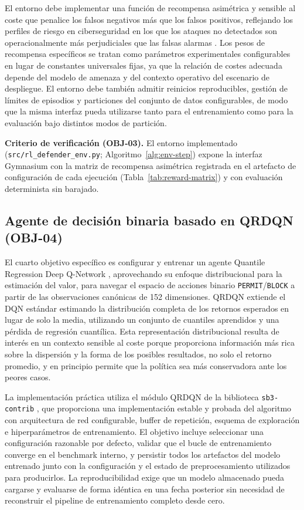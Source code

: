 El entorno debe implementar una función de recompensa asimétrica y sensible al coste que penalice los falsos negativos más que los falsos positivos, reflejando los perfiles de riesgo en ciberseguridad en los que los ataques no detectados son operacionalmente más perjudiciales que las falsas alarmas \parencite{Lee2002CostSensitiveIDS,Cardenas2006IDSFramework}. Los pesos de recompensa específicos se tratan como parámetros experimentales configurables en lugar de constantes universales fijas, ya que la relación de costes adecuada depende del modelo de amenaza y del contexto operativo del escenario de despliegue. El entorno debe también admitir reinicios reproducibles, gestión de límites de episodios y particiones del conjunto de datos configurables, de modo que la misma interfaz pueda utilizarse tanto para el entrenamiento como para la evaluación bajo distintos modos de partición.

\textbf{Criterio de verificación (OBJ-03).} El entorno implementado (\texttt{src/rl\_defender\_env.py}; Algoritmo~\ref{alg:env-step}) expone la interfaz Gymnasium con la matriz de recompensa asimétrica registrada en el artefacto de configuración de cada ejecución (Tabla~\ref{tab:reward-matrix}) y con evaluación determinista sin barajado.

\subsection{Agente de decisión binaria basado en QRDQN (OBJ-04)}
El cuarto objetivo específico es configurar y entrenar un agente Quantile Regression Deep Q-Network \parencite{Dabney2018QRDQN}, aprovechando su enfoque distribucional para la estimación del valor, para navegar el espacio de acciones binario \texttt{PERMIT}/\texttt{BLOCK} a partir de las observaciones canónicas de 152 dimensiones. QRDQN extiende el DQN estándar estimando la distribución completa de los retornos esperados en lugar de solo la media, utilizando un conjunto de cuantiles aprendidos y una pérdida de regresión cuantílica. Esta representación distribucional resulta de interés en un contexto sensible al coste porque proporciona información más rica sobre la dispersión y la forma de los posibles resultados, no solo el retorno promedio, y en principio permite que la política sea más conservadora ante los peores casos.

La implementación práctica utiliza el módulo QRDQN de la biblioteca \texttt{sb3-contrib} \parencite{SB3ContribQRDQNDocs}, que proporciona una implementación estable y probada del algoritmo con arquitectura de red configurable, buffer de repetición, esquema de exploración e hiperparámetros de entrenamiento. El objetivo incluye seleccionar una configuración razonable por defecto, validar que el bucle de entrenamiento converge en el benchmark interno, y persistir todos los artefactos del modelo entrenado junto con la configuración y el estado de preprocesamiento utilizados para producirlos. La reproducibilidad exige que un modelo almacenado pueda cargarse y evaluarse de forma idéntica en una fecha posterior sin necesidad de reconstruir el pipeline de entrenamiento completo desde cero.

